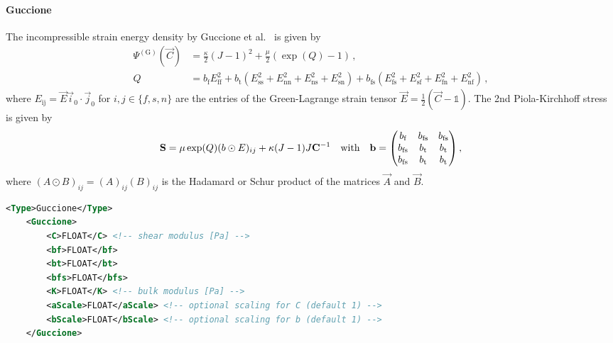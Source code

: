 \paragraph{Guccione}
The incompressible strain energy density by Guccione et al.~\cite{guccione95} is given by
\begin{align}
    \Psi^{(\mathrm{G})} (\vec C) &= \frac{\kappa}{2} (J-1)^2 + \frac{\mu}{2}(\exp(Q) -1) \,, \nonumber\\
    Q &= b_\text{f} E_\text{ff}^2 + 
    b_\text{t} (E_\text{ss}^2 + E_\text{nn}^2 + E_\text{ns}^2 + E_\text{sn}^2) +
    b_\text{fs} (E_\text{fs}^2 + E_\text{sf}^2 + E_\text{fn}^2 + E_\text{nf}^2) \,,\label{eq:guccione}
\end{align}
where $E_\text{ij} = \vec E \vec i_0 \cdot \vec j_0$ for $i,j \in \{f,s,n\}$ are the entries of the Green-Lagrange strain tensor ${\vec E = \frac{1}{2}(\vec C - \mathds{1})}$.
The 2nd Piola-Kirchhoff stress is given by
\begin{equation}
    \vec S = 
    \mu \exp(Q) (b \odot E)_{ij} + \kappa (J-1) J \vec C^{-1} \qq{with} \vec b = 
    \mqty( b_\text{f} &  b_\text{fs} &  b_\text{fs} \\ 
           b_\text{fs} &  b_\text{t} &  b_\text{t} \\ 
           b_\text{fs} &  b_\text{t} &  b_\text{t}) \,,
\end{equation}
where $(A \odot B)_{ij} = (A)_{ij}(B)_{ij}$ is the Hadamard or Schur product of the matrices $\vec A$ and $\vec B$.

\begin{lstlisting}[language=XML,caption=.xml settings for Guccione material]
    <Type>Guccione</Type>
    <Guccione>
        <C>FLOAT</C> <!-- shear modulus [Pa] -->
        <bf>FLOAT</bf>
        <bt>FLOAT</bt>
        <bfs>FLOAT</bfs>
        <K>FLOAT</K> <!-- bulk modulus [Pa] -->
        <aScale>FLOAT</aScale> <!-- optional scaling for C (default 1) -->
        <bScale>FLOAT</bScale> <!-- optional scaling for b (default 1) -->
    </Guccione>
\end{lstlisting}

